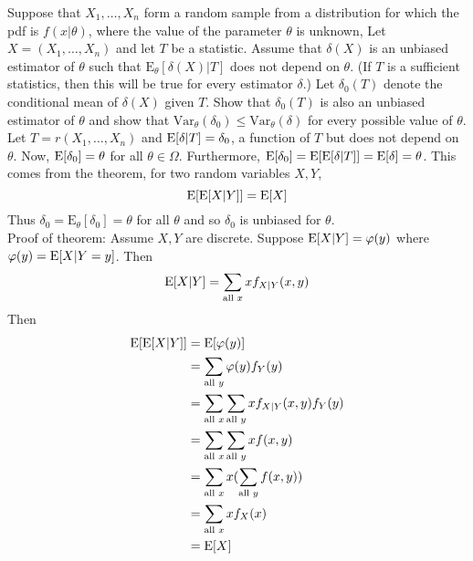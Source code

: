\documentclass[12pt]{article}
\begin{document}
Suppose that $X_1,\dots,X_n$ form a random sample from a distribution for which the pdf is $f(x|\theta)$, where the value of the parameter $\theta$ is unknown, Let $X = (X_1,\dots,X_n)$ and let $T$ be a statistic. Assume that $\delta(X)$ is an unbiased estimator of $\theta$ such that $\mathrm{E}_\theta[\delta(X) | T]$ does not depend on $\theta$. (If $T$ is a sufficient statistics, then this will be true for every estimator $\delta$.) Let $\delta_0(T)$ denote the conditional mean of $\delta(X)$ given $T$. Show that $\delta_0(T)$ is also an unbiased estimator of $\theta$ and show that $\mathrm{Var}_\theta(\delta_0) \leq \mathrm{Var}_\theta(\delta)$ for every possible value of $\theta$. \\ 
Let $T = r(X_1,\dots,X_n)$ and $\mathrm{E}[ \delta | T ] = \delta_0$, a function of $T$ but does not depend on $\theta$. Now, $\mathrm{E}[ \delta_0 ] = \theta$ for all $\theta \in \Omega$. Furthermore, $\mathrm{E}[ \delta_0 ] = \mathrm{E}[ \mathrm{E}[ \delta | T ] ] = \mathrm{E}[ \delta ] = \theta$. This comes from the theorem, for two random variables $X,Y$, $$\mathrm{E}[ \mathrm{E}[ X |Y ] ] = \mathrm{E}[ X ] $$ Thus $\delta_0 = \mathrm{E}_\theta[\delta_0] = \theta$ for all $\theta$ and so $\delta_0$ is unbiased for $\theta$. \\
Proof of theorem: Assume $X,Y$ are discrete. Suppose $\mathrm{E}[ X|Y ] = \varphi(y)$ where $\varphi(y) = \mathrm{E}[ X | Y=y ]$. Then $$\mathrm{E}[ X|Y ] = \sum_{\text{all } x} xf_{X|Y}(x,y) $$ Then $$ \begin{aligned} \mathrm{E}[ \mathrm{E}[ X | Y ] ] &= \mathrm{E}[ \varphi(y) ] \\ &= \sum_{\text{all } y} \varphi(y) f_Y(y) \\ &= \sum_{\text{all } x} \sum_{\text{all }y } xf_{X|Y}(x,y) f_Y(y) \\ &= \sum_{\text{all }x} \sum_{\text{all }y} xf(x,y) \\ &= \sum_{\text{all }x} x(\sum_{\text{all }y} f(x,y)) \\ &= \sum_{\text{all }x} xf_X(x) \\ &= \mathrm{E}[ X ] \end{aligned} $$ 
\end{document}
